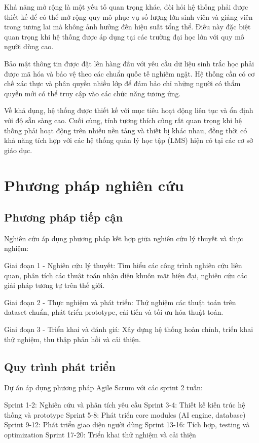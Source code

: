 \documentclass[12pt,a4paper]{report}
\begin{document}
Khả năng mở rộng là một yếu tố quan trọng khác, đòi hỏi hệ thống phải được thiết kế để có thể mở rộng quy mô phục vụ số lượng lớn sinh viên và giảng viên trong tương lai mà không ảnh hưởng đến hiệu suất tổng thể. Điều này đặc biệt quan trọng khi hệ thống được áp dụng tại các trường đại học lớn với quy mô người dùng cao.

Bảo mật thông tin được đặt lên hàng đầu với yêu cầu dữ liệu sinh trắc học phải được mã hóa và bảo vệ theo các chuẩn quốc tế nghiêm ngặt. Hệ thống cần có cơ chế xác thực và phân quyền nhiều lớp để đảm bảo chỉ những người có thẩm quyền mới có thể truy cập vào các chức năng tương ứng.

Về khả dụng, hệ thống được thiết kế với mục tiêu hoạt động liên tục và ổn định với độ sẵn sàng cao. Cuối cùng, tính tương thích cũng rất quan trọng khi hệ thống phải hoạt động trên nhiều nền tảng và thiết bị khác nhau, đồng thời có khả năng tích hợp với các hệ thống quản lý học tập (LMS) hiện có tại các cơ sở giáo dục.

\section{Phương pháp nghiên cứu}
\subsection{Phương pháp tiếp cận}
Nghiên cứu áp dụng phương pháp kết hợp giữa nghiên cứu lý thuyết và thực nghiệm:

Giai đoạn 1 - Nghiên cứu lý thuyết: Tìm hiểu các công trình nghiên cứu liên quan, phân tích các thuật toán nhận diện khuôn mặt hiện đại, nghiên cứu các giải pháp tương tự trên thế giới.

Giai đoạn 2 - Thực nghiệm và phát triển: Thử nghiệm các thuật toán trên dataset chuẩn, phát triển prototype, cải tiến và tối ưu hóa thuật toán.

Giai đoạn 3 - Triển khai và đánh giá: Xây dựng hệ thống hoàn chỉnh, triển khai thử nghiệm, thu thập phản hồi và cải thiện.

\subsection{Quy trình phát triển}
Dự án áp dụng phương pháp Agile Scrum với các sprint 2 tuần:

Sprint 1-2: Nghiên cứu và phân tích yêu cầu
Sprint 3-4: Thiết kế kiến trúc hệ thống và prototype
Sprint 5-8: Phát triển core modules (AI engine, database)
Sprint 9-12: Phát triển giao diện người dùng
Sprint 13-16: Tích hợp, testing và optimization
Sprint 17-20: Triển khai thử nghiệm và cải thiện
\end{document}
